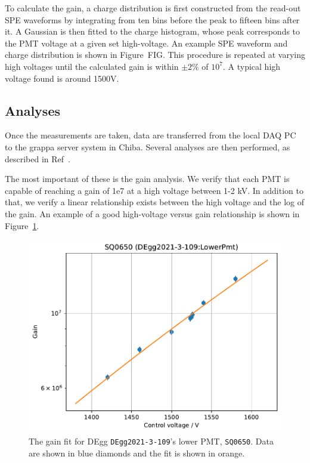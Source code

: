 \documentclass[main.tex]{subfiles}
\begin{document}
To calculate the gain, a charge distribution is first constructed from the read-out SPE waveforms by integrating from ten bins before the peak to fifteen bins after it.
A Gaussian is then fitted to the charge histogram, whose peak corresponds to the PMT voltage at a given set high-voltage. An example SPE waveform and charge distribution is shown in Figure~FIG.
This procedure is repeated at varying high voltages until the calculated gain is within $\pm 2\%$ of $10^{7}$.
A typical high voltage found is around 1500V. 

\subsection{Analyses}

Once the measurements are taken, data are transferred from the local DAQ PC to the grappa server system in Chiba. Several analyses are then performed, as described in Ref~\cite{degg}. 

The most important of these is the gain analysis. 
We verify that each PMT is capable of reaching a gain of 1e7 at a high voltage between 1-2 kV. 
In addition to that, we verify a linear relationship exists between the high voltage and the log of the gain. 
An example of a good high-voltage versus gain relationship is shown in Figure~\ref{fig:degg_gain_curve}.

\begin{figure}
    \centering
    \includegraphics[width=0.8\linewidth]{figures/gain_curve_SQ0650.pdf}
    \caption{The gain fit for DEgg \texttt{DEgg2021-3-109}'s lower PMT, \texttt{SQ0650}. Data are shown in blue diamonds and the fit is shown in orange.}\label{fig:degg_gain_curve}
\end{figure}
\end{document}
